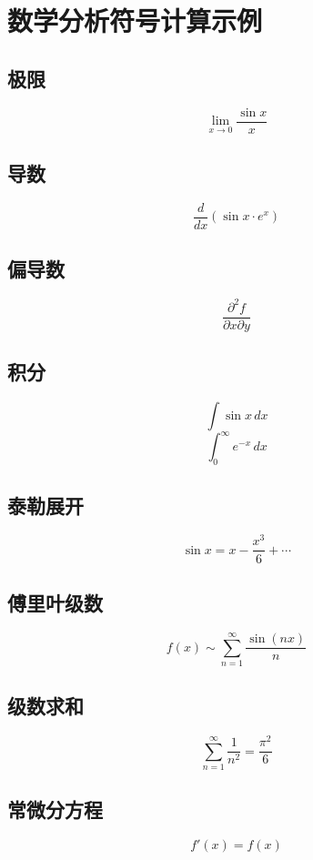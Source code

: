 \documentclass{article}
\begin{document}
\section{数学分析符号计算示例}

\subsection{极限}
\[ \lim_{x \to 0} \frac{\sin x}{x} \]

\subsection{导数}
\[ \frac{d}{dx} (\sin x \cdot e^x) \]

\subsection{偏导数}
\[ \frac{\partial^2 f}{\partial x \partial y} \]

\subsection{积分}
\[ \int \sin x \, dx \]
\[ \int_0^\infty e^{-x} \, dx \]

\subsection{泰勒展开}
\[ \sin x = x - \frac{x^3}{6} + \cdots \]

\subsection{傅里叶级数}
\[ f(x) \sim \sum_{n=1}^\infty \frac{\sin(nx)}{n} \]

\subsection{级数求和}
\[ \sum_{n=1}^\infty \frac{1}{n^2} = \frac{\pi^2}{6} \]

\subsection{常微分方程}
\[ f'(x) = f(x) \]
\end{document}
